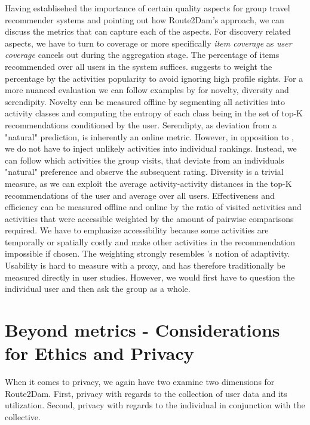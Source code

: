 \documentclass[11pt,a4paper,oneside]{article}
\begin{document}
Having establisehed the importance of certain quality aspects for group travel recommender systems and pointing out how Route2Dam's approach, we can discuss the metrics that can capture each of the aspects. 
For discovery related aspects, we have to turn to coverage or more specifically \emph{item coverage} as \emph{user coverage} cancels out during the aggregation stage. The percentage of items recommended over all users in the system suffices. \citeauthor{CITE-Shani} suggests to weight the percentage by the activities popularity to avoid ignoring high profile sights. For a more nuanced evaluation we can follow examples by \citeauthor{CITE-Shani} for novelty, diversity and serendipity. Novelty can be measured offline by segmenting all activities into activity classes and computing the entropy of each class being in the set of top-K recommendations conditioned by the user. Serendipty, as deviation from a "natural" prediction, is inherently an online metric. However, in opposition to \citeauthor{Shani}, we do not have to inject unlikely activities into individual rankings. Instead, we can follow which activities the group visits, that deviate from an individuals "natural" preference and observe the subsequent rating. Diversity is a trivial measure, as we can exploit the average activity-activity distances in the top-K recommendations of the user and average over all users. Effectiveness and efficiency can be measured offline and online by the ratio of visited activities and activities that were accessible weighted by the amount of pairwise comparisons required. We have to emphasize accessibility because some activities are temporally or spatially costly and make other activities in the recommendation impossible if chosen. The weighting strongly resembles \citeauthor{CITE-Shani}'s notion of adaptivity. Usability is hard to measure with a proxy, and has therefore traditionally be measured directly in user studies. However, we would first have to question the individual user and then ask the group as a whole.


\section{Beyond metrics - Considerations for Ethics and Privacy}
When it comes to privacy, we again have two examine two dimensions for Route2Dam. First, privacy with regards to the collection of user data and its utilization. Second, privacy with regards to the individual in conjunction with the collective. 
\end{document}
